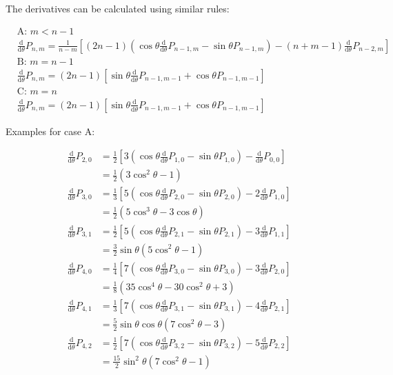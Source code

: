 \documentclass[]{article}
\begin{document}
		The derivatives can be calculated using similar rules:
		
		\begin{align}
			&\text{A: }  m < n-1  \nonumber \\ 
			&\frac{\text{d}}{\text{d}\theta} P_{n,m} = \frac{1}{n-m} \left[(2n-1)\left(\cos{\theta}\frac{\text{d}}{\text{d}\theta}P_{n-1,m} - \sin{\theta}P_{n-1,m}\right) - (n+m-1)\frac{\text{d}}{\text{d}\theta}P_{n-2,m}\right] \\
			&\text{B: }  m = n-1  \nonumber \\ 
			&\frac{\text{d}}{\text{d}\theta} P_{n,m} = (2n-1) \left[\sin{\theta}\frac{\text{d}}{\text{d}\theta}P_{n-1,m-1} + \cos{\theta}P_{n-1,m-1}\right] \\
			&\text{C: }  m = n  \nonumber \\ 
			&\frac{\text{d}}{\text{d}\theta} P_{n,m} = (2n-1) \left[\sin{\theta}\frac{\text{d}}{\text{d}\theta}P_{n-1,m-1} + \cos{\theta}P_{n-1,m-1}\right]
		\end{align}
		
		Examples for case A:
		
		\begin{align}
			\frac{\text{d}}{\text{d}\theta}P_{2,0} &= \frac{1}{2}\left[3\left(\cos{\theta}\frac{\text{d}}{\text{d}\theta}P_{1,0} - \sin{\theta}P_{1,0}\right) - \frac{\text{d}}{\text{d} \theta} P_{0,0}\right] \\
				&= \frac{1}{2} (3 \cos^2{\theta} -1)\\
			\frac{\text{d}}{\text{d}\theta}P_{3,0} &= \frac{1}{3}\left[5\left(\cos{\theta}\frac{\text{d}}{\text{d}\theta}P_{2,0} - \sin{\theta}P_{2,0}\right) - 2\frac{\text{d}}{\text{d} \theta} P_{1,0}\right] \\
				&= \frac{1}{2}(5\cos^3{\theta} - 3\cos{\theta})\\
			\frac{\text{d}}{\text{d}\theta}P_{3,1} &= \frac{1}{2}\left[5\left(\cos{\theta}\frac{\text{d}}{\text{d}\theta}P_{2,1} - \sin{\theta}P_{2,1}\right) - 3\frac{\text{d}}{\text{d} \theta} P_{1,1}\right] \\
				&= \frac{3}{2}\sin{\theta}(5\cos^2{\theta} - 1)\\
			\frac{\text{d}}{\text{d}\theta}P_{4,0} &= \frac{1}{4}\left[7\left(\cos{\theta}\frac{\text{d}}{\text{d}\theta}P_{3,0} - \sin{\theta}P_{3,0}\right) - 3\frac{\text{d}}{\text{d} \theta} P_{2,0}\right] \\
				&= \frac{1}{8}(35\cos^4{\theta} - 30\cos^2{\theta} + 3)\\
			\frac{\text{d}}{\text{d}\theta}P_{4,1} &= \frac{1}{3}\left[7\left(\cos{\theta}\frac{\text{d}}{\text{d}\theta}P_{3,1} - \sin{\theta}P_{3,1}\right) - 4\frac{\text{d}}{\text{d} \theta} P_{2,1}\right] \\
				&= \frac{5}{2} \sin{\theta}\cos{\theta}(7\cos^2{\theta} - 3) \\
			\frac{\text{d}}{\text{d}\theta}P_{4,2} &= \frac{1}{2}\left[7\left(\cos{\theta}\frac{\text{d}}{\text{d}\theta}P_{3,2} - \sin{\theta}P_{3,2}\right) - 5\frac{\text{d}}{\text{d} \theta} P_{2,2}\right] \\
				&= \frac{15}{2}\sin^2{\theta}(7\cos^2{\theta} - 1)
		\end{align}
		
\end{document}

